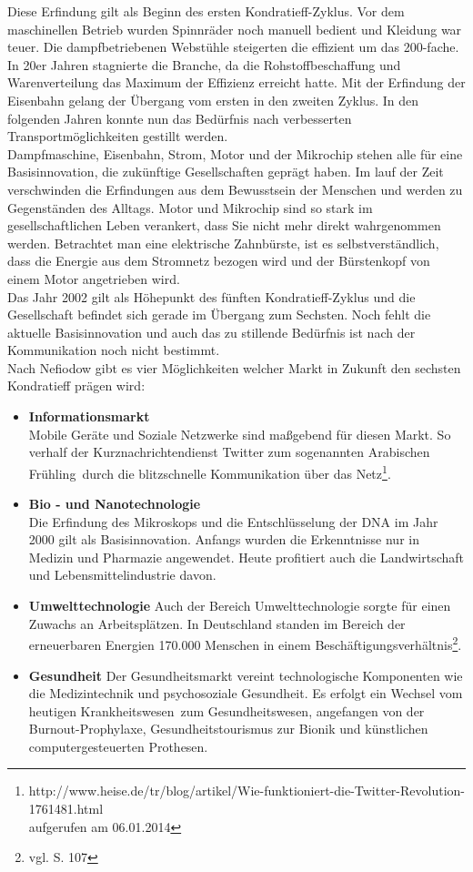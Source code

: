 Diese Erfindung gilt als Beginn des ersten Kondratieff-Zyklus. Vor dem maschinellen Betrieb wurden Spinnräder noch manuell bedient und Kleidung war teuer. Die dampfbetriebenen Webstühle steigerten
die effizient um das 200-fache. In 20er Jahren stagnierte die Branche, da die Rohstoffbeschaffung und Warenverteilung das Maximum der Effizienz erreicht hatte. Mit der Erfindung der Eisenbahn gelang der Übergang vom ersten in den zweiten Zyklus. In den folgenden Jahren konnte nun das Bedürfnis nach verbesserten Transportmöglichkeiten gestillt werden.\\
Dampfmaschine, Eisenbahn, Strom, Motor und der Mikrochip stehen alle für eine Basisinnovation, die zukünftige Gesellschaften geprägt haben. Im lauf der Zeit verschwinden die Erfindungen aus dem Bewusstsein der Menschen und werden zu Gegenständen des Alltags. Motor und Mikrochip sind so stark im gesellschaftlichen Leben verankert, dass Sie nicht mehr direkt wahrgenommen werden. Betrachtet man eine elektrische Zahnbürste, ist es selbstverständlich, dass die Energie aus dem Stromnetz bezogen wird und der Bürstenkopf von einem Motor angetrieben wird.\\
Das Jahr 2002 gilt als Höhepunkt des fünften Kondratieff-Zyklus und die Gesellschaft befindet sich gerade im Übergang zum Sechsten. Noch fehlt die aktuelle Basisinnovation und auch das zu stillende Bedürfnis ist nach der Kommunikation noch nicht bestimmt.\\
Nach Nefiodow \cite{nefiodow:gesundheit} gibt es vier Möglichkeiten welcher Markt in Zukunft den sechsten Kondratieff prägen wird:
\begin{itemize}
  \item \textbf{Informationsmarkt} \\
  		Mobile Geräte und Soziale Netzwerke sind maßgebend für diesen Markt. So verhalf der Kurznachrichtendienst Twitter zum sogenannten \glqq Arabischen Frühling\grqq\, durch die blitzschnelle Kommunikation über das Netz\footnote{http://www.heise.de/tr/blog/artikel/Wie-funktioniert-die-Twitter-Revolution-1761481.html \\aufgerufen am 06.01.2014}.
  \item \textbf{Bio - und Nanotechnologie} \\
  		Die Erfindung des Mikroskops und die Entschlüsselung der DNA im Jahr 2000 gilt als Basisinnovation. Anfangs wurden die Erkenntnisse nur in Medizin und Pharmazie angewendet. Heute profitiert auch die Landwirtschaft und Lebensmittelindustrie davon.
  \item \textbf{Umwelttechnologie}
  		Auch der Bereich Umwelttechnologie sorgte für einen Zuwachs an Arbeitsplätzen. In Deutschland standen im Bereich der erneuerbaren Energien 170.000 Menschen in einem Beschäftigungsverhältnis\footnote{vgl. \cite{nefiodow:gesundheit} S. 107}.
  \item \textbf{Gesundheit}
  		Der Gesundheitsmarkt vereint technologische Komponenten wie die Medizintechnik und psychosoziale Gesundheit. Es erfolgt ein Wechsel vom heutigen \glqq Krankheitswesen\grqq\ zum Gesundheitswesen, angefangen von der Burnout-Prophylaxe, Gesundheitstourismus zur Bionik und künstlichen computergesteuerten Prothesen.
\end{itemize}


